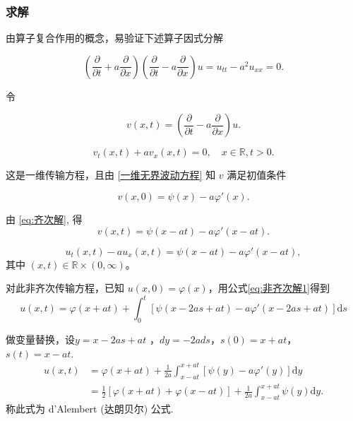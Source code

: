 \documentclass[12pt,a4paper]{article}
\numberwithin{subsection}{section}   %
\numberwithin{subsubsection}{subsection}
\theoremstyle{plain}
\theoremstyle{definition}
\theoremstyle{remark}
\theoremstyle{remark}
\begin{document}
\subsubsection{求解}
	由算子复合作用的概念，易验证下述算子因式分解
	
	\begin{equation}
		\left( \frac{\partial}{\partial t} + a \frac{\partial}{\partial x} \right) \left( \frac{\partial}{\partial t} - a \frac{\partial}{\partial x} \right) u = u_{tt} - a^2 u_{xx} = 0.
	\end{equation}
	
	令
	
	\begin{equation}
		v(x, t) = \left( \frac{\partial}{\partial t} - a \frac{\partial}{\partial x} \right) u.
	\end{equation}
	
	\begin{equation}
	v_t(x, t) + a v_x(x, t) = 0, \quad x \in \mathbb{R}, t > 0.
\end{equation}
	
	这是一维传输方程，且由 \eqref{一维无界波动方程} 知 \(v\) 满足初值条件
	
	\begin{equation}
	v(x, 0) = \psi(x) - a \varphi'(x).
\end{equation}
	
	由 \eqref{eq:齐次解}, 得
	\begin{equation}
		v(x, t) = \psi(x - a t) - a \varphi'(x - a t).
	\end{equation}
	
	\begin{equation}
		u_t(x, t) - a u_x(x, t) = \psi(x - a t) - a \varphi'(x - a t),
	\end{equation}
	其中 \((x, t) \in \mathbb{R} \times (0, \infty)\)。
	
	对此非齐次传输方程，已知 \(u(x, 0) = \varphi(x)\)，用公式\eqref{eq:非齐次解1}得到
	\begin{equation}
			u(x, t) = \varphi(x + a t) + \int_0^t \left[ \psi(x - 2 a s + a t) - a \varphi'(x - 2 a s + a t) \right] \mathrm{d}s 
	\end{equation}
	
	
做变量替换，设$y=x−2as+at$	，$dy=−2ads$，$s(0)=x+at$，$s(t)=x-at$.
	\begin{equation}\label{eq:达朗贝尔公式}
	\begin{aligned}
		u(x, t) &= \varphi(x + a t) + \frac{1}{2 a} \int_{x - a t}^{x + a t} \left[ \psi(y) - a \varphi'(y) \right] \mathrm{d}y \\
		&= \frac{1}{2} \left[ \varphi(x + a t) + \varphi(x - a t) \right] + \frac{1}{2 a} \int_{x - a t}^{x + a t} \psi(y) \mathrm{d}y.
	\end{aligned}
\end{equation}
称此式为 d'Alembert (达朗贝尔) 公式.
	
\end{document}
